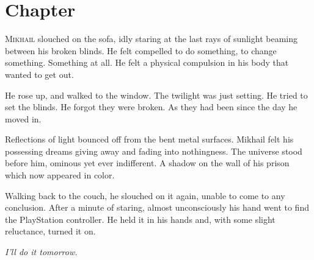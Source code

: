 \chapter{Chapter \thechapter}

\lettrine[lraise=0.1, nindent=0.1em, slope=-.5em]{M}{ikhail} slouched on the sofa, idly staring at the last rays of sunlight beaming between his broken blinds. He felt compelled to do something, to change something. Something at all. He felt a physical compulsion in his body that wanted to get out.

He rose up, and walked to the window. The twilight was just setting. He tried to set the blinds. He forgot they were broken. As they had been since the day he moved in.

Reflections of light bounced off from the bent metal surfaces. Mikhail felt his possessing dreams giving away and fading into nothingness. The universe stood before him, ominous yet ever indifferent. A shadow on the wall of his prison which now appeared in color.

Walking back to the couch, he slouched on it again, unable to come to any conclusion. After a minute of staring, almost unconsciously his hand went to find the PlayStation controller. He held it in his hands and, with some slight reluctance, turned it on.

\textit{I’ll do it tomorrow.}
